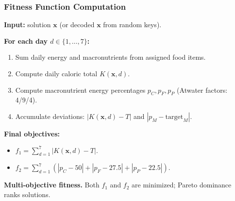 \documentclass[aspectratio=169,10pt]{beamer}
\begin{document}
\begin{frame}
\frametitle{Fitness Function Computation}

\textbf{Input:} solution $\mathbf{x}$ (or decoded $\mathbf{x}$ from random keys).

\vspace{0.2cm}

\textbf{For each day $d \in \{1,\dots,7\}$:}
\begin{enumerate}
  \item Sum daily energy and macronutrients from assigned food items.
  \item Compute daily caloric total $K(\mathbf{x},d)$.
  \item Compute macronutrient energy percentages $p_C, p_F, p_P$ (Atwater factors: 4/9/4).
  \item Accumulate deviations: $\left|K(\mathbf{x},d) - T\right|$ and $\left|p_M - \text{target}_M\right|$.
\end{enumerate}

\vspace{0.2cm}

\textbf{Final objectives:}
\begin{itemize}
  \item $f_1 = \sum_{d=1}^{7} \left|K(\mathbf{x},d) - T\right|$.
  \item $f_2 = \sum_{d=1}^{7}\left(\left|p_C-50\right| + \left|p_F-27.5\right| + \left|p_P-22.5\right|\right)$.
\end{itemize}

\vspace{0.2cm}

\textbf{Multi-objective fitness.} Both $f_1$ and $f_2$ are minimized; Pareto dominance ranks solutions.

\end{frame}
\end{document}
